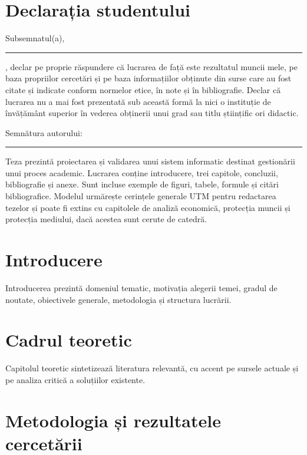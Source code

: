 \documentclass{../utmreport}
\begin{document}
\makeutmcover
\makeutmtitlepage

\chapter*{Declarația studentului}
Subsemnatul(a), \rule{6cm}{0.4pt}, declar pe proprie răspundere că lucrarea de față este rezultatul muncii mele, pe baza propriilor cercetări și pe baza informațiilor obținute din surse care au fost citate și indicate conform normelor etice, în note și în bibliografie. Declar că lucrarea nu a mai fost prezentată sub această formă la nici o instituție de învățământ superior în vederea obținerii unui grad sau titlu științific ori didactic.

\vspace{1cm}
\noindent Semnătura autorului: \rule{6cm}{0.4pt}
\clearpage

\begin{utmabstract}[Rezumat]
Teza prezintă proiectarea și validarea unui sistem informatic destinat gestionării unui proces academic. Lucrarea conține introducere, trei capitole, concluzii, bibliografie și anexe. Sunt incluse exemple de figuri, tabele, formule și citări bibliografice. Modelul urmărește cerințele generale UTM pentru redactarea tezelor și poate fi extins cu capitolele de analiză economică, protecția muncii și protecția mediului, dacă acestea sunt cerute de catedră.

\end{utmabstract}

\tableofcontents
\clearpage

\chapter{Introducere}

Introducerea prezintă domeniul tematic, motivația alegerii temei, gradul de noutate, obiectivele generale, metodologia și structura lucrării.

\chapter{Cadrul teoretic}

Capitolul teoretic sintetizează literatura relevantă, cu accent pe sursele actuale și pe analiza critică a soluțiilor existente.

\chapter{Metodologia și rezultatele cercetării}
\end{document}
